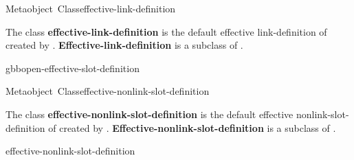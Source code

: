 \documentclass[10pt,twoside,english,pdftex]{article}
\begin{document}

\begin{functiondoc}{Metaobject~Class}{effective-link-definition}{}
%

\fnsyntax

\fnpackage {}

\fnmodule {}

\fndescription The class \textbf{effective-link-definition} is the default
effective link-definition  of 
created by \textbf{}.
\textbf{Effective-link-definition} is a subclass of
\textbf{}.

\begin{alsos}{gbbopen-effective-slot-definition}
\end{alsos}

\end{functiondoc}


\begin{functiondoc}{Metaobject~Class}{effective-nonlink-slot-definition}{}
%

\fnsyntax

\fnpackage {}

\fnmodule {}

\fndescription The class \textbf{effective-nonlink-slot-definition} is the
default effective nonlink-slot-definition  of
 created by \textbf{}.
\textbf{Effective-nonlink-slot-definition} is a subclass of
\textbf{}.

\begin{alsos}{effective-nonlink-slot-definition}
\end{alsos}

\end{functiondoc}

\end{document}

